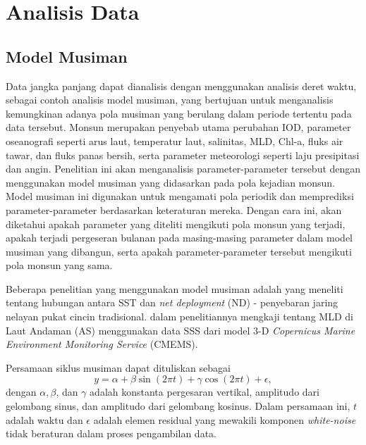 \section[Analisis Data]{Analisis Data}
\begin{spacing}{1.5}
	\subsection[Model Musiman]{Model Musiman}

	Data jangka panjang dapat dianalisis dengan menggunakan analisis deret waktu, sebagai contoh analisis model musiman, yang bertujuan untuk menganalisis kemungkinan adanya pola musiman yang berulang dalam periode tertentu pada data tersebut. Monsun merupakan penyebab utama perubahan IOD, parameter oseanografi seperti arus laut, temperatur laut, salinitas, MLD, Chl-a, fluks air tawar, dan fluks panas bersih, serta parameter meteorologi seperti laju presipitasi dan angin. Penelitian ini akan menganalisis parameter-parameter tersebut dengan menggunakan model musiman yang didasarkan pada pola kejadian monsun. Model musiman ini digunakan untuk mengamati pola periodik dan memprediksi parameter-parameter berdasarkan keteraturan mereka. Dengan cara ini, akan diketahui apakah parameter yang diteliti mengikuti pola monsun yang terjadi, apakah terjadi pergeseran bulanan pada masing-masing parameter dalam model musiman yang dibangun, serta apakah parameter-parameter tersebut mengikuti pola monsun yang sama.

	Beberapa penelitian yang menggunakan model musiman adalah  \citeyear{Haridhi2016} yang meneliti tentang hubungan antara SST dan \textit{net deployment} (ND) - penyebaran jaring nelayan pukat cincin tradisional.  \citeyear{Ikhwan2022} dalam penelitiannya mengkaji tentang MLD di Laut Andaman (AS) menggunakan data SSS dari model 3-D \textit{Copernicus Marine Environment Monitoring Service} (CMEMS).  
	
	Persamaan siklus musiman \cite{crawley2012r} dapat dituliskan sebagai
	\begin{equation}\label{eq:sm_}
		y = \alpha + \beta \sin(2\pi t)+\gamma \cos(2\pi t) + \epsilon,
	\end{equation}
	dengan $\alpha, \beta$, dan $\gamma$  adalah konstanta pergesaran vertikal, amplitudo dari gelombang sinus, dan amplitudo dari gelombang kosinus. Dalam persamaan ini, $t$ adalah waktu dan $\epsilon$ adalah elemen residual yang mewakili komponen \textit{white-noise} tidak beraturan dalam proses pengambilan data. 
	

\end{spacing}
